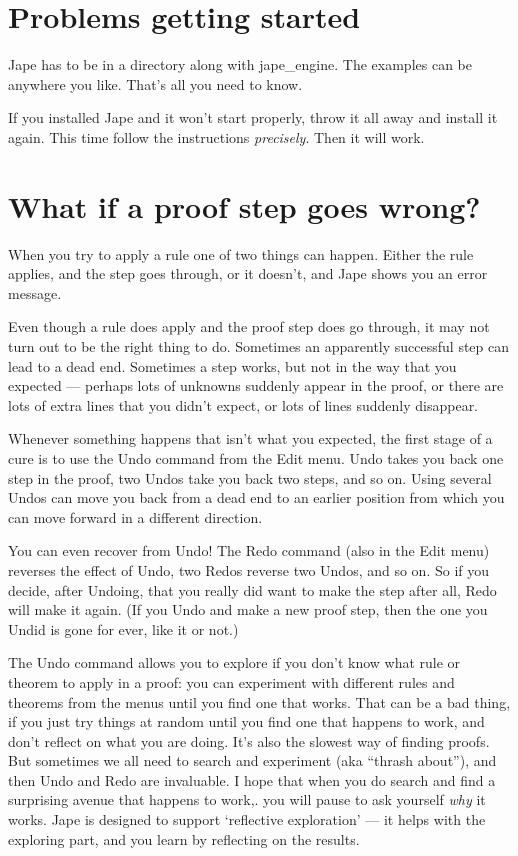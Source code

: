 \documentclass[11pt]{book}
\begin{document}
\section{Problems getting started}

Jape has to be in a directory along with jape\_engine. The examples can be anywhere you like. That's all you need to know.

If you installed Jape and it won't start properly, throw it all away and install it again. This time follow the instructions \emph{precisely}. Then it will work.

\section{What if a proof step goes wrong?}

When you try to apply a rule one of two things can happen. Either the rule applies, and the step goes through, or it doesn't, and Jape shows you an error message.

Even though a rule does apply and the proof step does go through, it may not turn out to be the right thing to do. Sometimes an apparently successful step can lead to a dead end. Sometimes a step works, but not in the way that you expected --- perhaps lots of unknowns suddenly appear in the proof, or there are lots of extra lines that you didn't expect, or lots of lines suddenly disappear.

Whenever something happens that isn't what you expected, the first stage of a cure is to use the Undo command from the Edit menu. Undo takes you back one step in the proof, two Undos take you back two steps, and so on. Using several Undos can move you back from a dead end to an earlier position from which you can 
move forward in a different direction.

You can even recover from Undo! The Redo command (also in the Edit menu) reverses the effect of Undo, two Redos reverse two Undos, and so on. So if you decide, after Undoing, that you really did want to make the step after all, Redo will make it again. (If you Undo and make a new proof step, then the one you Undid is 
gone for ever, like it or not.)

The Undo command allows you to explore if you don't know what rule or theorem to apply in a proof: you can experiment with different rules and theorems from the menus until you find one that works. That can be a bad thing, if you just try things at random until you find one that happens to work, and don't reflect on what you are doing. It's also the slowest way of finding proofs. But sometimes we all need to search and experiment (aka ``thrash about''), and then Undo and Redo are invaluable. I hope that when you do search and find a surprising avenue that happens to work,. you will pause to ask yourself \emph{why} it works. Jape is designed to support `reflective exploration' --- it helps with the exploring part, and you learn by reflecting on the results.
\end{document}
